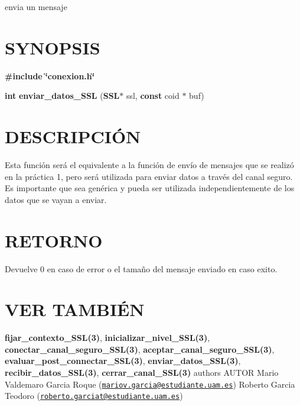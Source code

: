 envia un mensaje\hypertarget{cerrar_canal__s_s_l_SYNOPSIS}{}\section{S\-Y\-N\-O\-P\-S\-I\-S}\label{cerrar_canal__s_s_l_SYNOPSIS}
{\bfseries \#include} {\bfseries \char`\"{}conexion.\-h\char`\"{}} 

{\bfseries int} {\bfseries enviar\-\_\-datos\-\_\-\-S\-S\-L} {\bfseries }({\bfseries S\-S\-L$\ast$} ssl, {\bfseries const} coid $\ast$ buf{\bfseries })\hypertarget{cerrar_canal__s_s_l_descripcion}{}\section{D\-E\-S\-C\-R\-I\-P\-C\-IÓ\-N}\label{cerrar_canal__s_s_l_descripcion}
Esta función será el equivalente a la función de envío de mensajes que se realizó en la práctica 1, pero será utilizada para enviar datos a través del canal seguro. Es importante que sea genérica y pueda ser utilizada independientemente de los datos que se vayan a enviar.\hypertarget{cerrar_canal__s_s_l_retorno}{}\section{R\-E\-T\-O\-R\-N\-O}\label{cerrar_canal__s_s_l_retorno}
Devuelve 0 en caso de error o el tamaño del mensaje enviado en caso exito.\hypertarget{cerrar_canal__s_s_l_seealso}{}\section{V\-E\-R T\-A\-M\-B\-IÉ\-N}\label{cerrar_canal__s_s_l_seealso}
{\bfseries fijar\-\_\-contexto\-\_\-\-S\-S\-L(3)}, {\bfseries inicializar\-\_\-nivel\-\_\-\-S\-S\-L(3)}, {\bfseries conectar\-\_\-canal\-\_\-seguro\-\_\-\-S\-S\-L(3)}, {\bfseries aceptar\-\_\-canal\-\_\-seguro\-\_\-\-S\-S\-L(3)}, {\bfseries evaluar\-\_\-post\-\_\-connectar\-\_\-\-S\-S\-L(3)}, {\bfseries enviar\-\_\-datos\-\_\-\-S\-S\-L(3)}, {\bfseries recibir\-\_\-datos\-\_\-\-S\-S\-L(3)}, {\bfseries cerrar\-\_\-canal\-\_\-\-S\-S\-L(3)} {\bfseries }  authors A\-U\-T\-O\-R Mario Valdemaro Garcia Roque (\href{mailto:mariov.garcia@estudiante.uam.es}{\tt mariov.\-garcia@estudiante.\-uam.\-es}) Roberto Garcia Teodoro (\href{mailto:roberto.garciat@estudiante.uam.es}{\tt roberto.\-garciat@estudiante.\-uam.\-es}) 